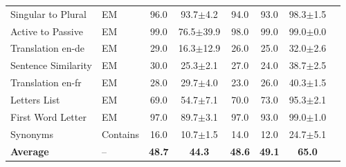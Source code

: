 \begin{table}[htbp]
{\begin{tabular}{@{}llcccccc@{}}
Singular to Plural & EM & 96.0 & 93.7$\pm$4.2 & 94.0 & 93.0 & 98.3$\pm$1.5 \\
Active to Passive & EM & 99.0 & 76.5$\pm$39.9 & 98.0 & 99.0 & 99.0$\pm$0.0 \\
Translation en-de & EM & 29.0 & 16.3$\pm$12.9 & 26.0 & 25.0 & 32.0$\pm$2.6 \\
Sentence Similarity & EM & 30.0 & 25.3$\pm$2.1 & 27.0 & 24.0 & 38.7$\pm$2.5 \\
Translation en-fr & EM & 28.0 & 29.7$\pm$4.0 & 23.0 & 26.0 & 40.3$\pm$1.5 \\
Letters List & EM & 69.0 & 54.7$\pm$7.1 & 70.0 & 73.0 & 95.3$\pm$2.1 \\
First Word Letter & EM & 97.0 & 89.7$\pm$3.1 & 97.0 & 93.0 & 99.0$\pm$1.0 \\
Synonyms & Contains & 16.0 & 10.7$\pm$1.5 & 14.0 & 12.0 & 24.7$\pm$5.1 \\
\midrule
\textbf{Average} & -- & \textbf{48.7} & \textbf{44.3} & \textbf{48.6} & \textbf{49.1} & \textbf{65.0} \\
\bottomrule
\end{tabular}
}
\end{table}
